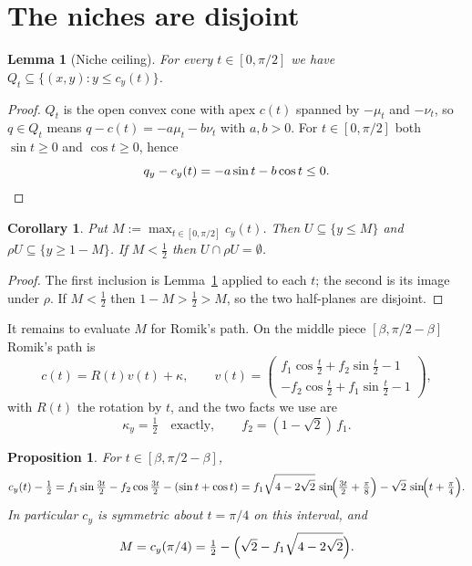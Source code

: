 \documentclass[11pt]{article}
\newtheorem{lemma}[theorem]{Lemma}
\newtheorem{proposition}[theorem]{Proposition}
\newtheorem{corollary}[theorem]{Corollary}
\theoremstyle{definition}
\begin{document}
\section{The niches are disjoint}

\begin{lemma}[Niche ceiling]\label{lem:ceiling}
For every $t\in[0,\pi/2]$ we have $Q_t\subseteq\{(x,y):y\le c_y(t)\}$.
\end{lemma}

\begin{proof}
$Q_t$ is the open convex cone with apex $c(t)$ spanned by $-\mu_t$ and $-\nu_t$,
so $q\in Q_t$ means $q-c(t)=-a\mu_t-b\nu_t$ with $a,b>0$. For $t\in[0,\pi/2]$
both $\sin t\ge0$ and $\cos t\ge0$, hence
\[
  q_y-c_y(t)=-a\sin t-b\cos t\le 0. \qedhere
\]
\end{proof}

\begin{corollary}\label{cor:sep}
Put $M:=\max_{t\in[0,\pi/2]}c_y(t)$. Then $U\subseteq\{y\le M\}$ and
$\rho U\subseteq\{y\ge 1-M\}$. If $M<\tfrac12$ then $U\cap\rho U=\emptyset$.
\end{corollary}

\begin{proof}
The first inclusion is Lemma~\ref{lem:ceiling} applied to each $t$; the second is
its image under $\rho$. If $M<\tfrac12$ then $1-M>\tfrac12>M$, so the two
half-planes are disjoint.
\end{proof}

It remains to evaluate $M$ for Romik's path. On the middle piece
$[\beta,\pi/2-\beta]$ Romik's path is
\begin{equation}\label{eq:x6}
  c(t)=R(t)v(t)+\kappa,\qquad
  v(t)=\begin{pmatrix} f_1\cos\frac t2+f_2\sin\frac t2-1\\[2pt]
                      -f_2\cos\frac t2+f_1\sin\frac t2-1\end{pmatrix},
\end{equation}
with $R(t)$ the rotation by $t$, and the two facts we use are
\begin{equation}\label{eq:kf}
  \kappa_y=\tfrac12 \quad\text{exactly},
  \qquad f_2=(1-\sqrt2)\,f_1 .
\end{equation}

\begin{proposition}\label{prop:cy}
For $t\in[\beta,\pi/2-\beta]$,
\begin{equation}\label{eq:cy}
  c_y(t)-\tfrac12
   = f_1\sin\tfrac{3t}{2}-f_2\cos\tfrac{3t}{2}-(\sin t+\cos t)
   = f_1\sqrt{4-2\sqrt2}\,\sin\!\Bigl(\tfrac{3t}{2}+\tfrac\pi8\Bigr)-\sqrt2\,\sin\!\Bigl(t+\tfrac\pi4\Bigr).
\end{equation}
In particular $c_y$ is symmetric about $t=\pi/4$ on this interval, and
\begin{equation}\label{eq:M}
  M=c_y(\pi/4)=\tfrac12-\Bigl(\sqrt2-f_1\sqrt{4-2\sqrt2}\Bigr).
\end{equation}
\end{proposition}
\end{document}
